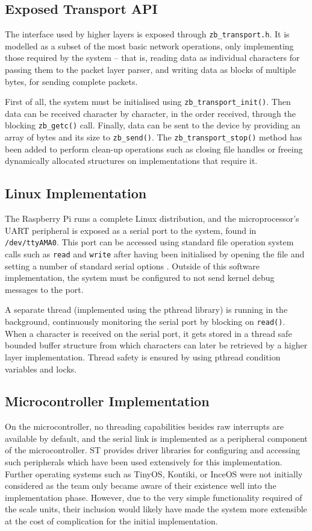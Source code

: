 \subsection{Exposed Transport API}
The interface used by higher layers is exposed through \texttt{zb\_transport.h}. It is modelled as a subset of the most basic network operations, only implementing those required by the system -- that is, reading data as individual characters for passing them to the packet layer parser, and writing data as blocks of multiple bytes, for sending complete packets.

First of all, the system must be initialised using \texttt{zb\_transport\_init()}. Then data can be received character by character, in the order received, through the blocking \texttt{zb\_getc()} call. Finally, data can be sent to the device by providing an array of bytes and its size to \texttt{zb\_send()}. The \texttt{zb\_transport\_stop()} method has been added to perform clean-up operations such as closing file handles or freeing dynamically allocated structures on implementations that require it.

\subsection{Linux Implementation}
The Raspberry Pi runs a complete Linux distribution, and the microprocessor's UART peripheral is exposed as a serial port to the system, found in \texttt{/dev/ttyAMA0}. This port can be accessed using standard file operation system calls such as \texttt{read} and \texttt{write} after having been initialised by opening the file and setting a number of standard serial options \cite{posix-serial-programming}. Outside of this software implementation, the system must be configured to not send kernel debug messages to the port\cite{pi-tty}.

A separate thread (implemented using the pthread library) is running in the background, continuously monitoring the serial port by blocking on \texttt{read()}. When a character is received on the serial port, it gets stored in a thread safe bounded buffer structure from which characters can later be  retrieved by a higher layer implementation. Thread safety is ensured by using pthread condition variables and locks.

\subsection{Microcontroller Implementation}
On the microcontroller, no threading capabilities besides raw interrupts are available by default, and the serial link is implemented as a peripheral component of the microcontroller. ST provides driver libraries for configuring and accessing such peripherals which have been used extensively for this implementation. Further operating systems such as TinyOS, Kontiki, or InceOS were not initially considered as the team only became aware of their existence well into the implementation phase. However, due to the very simple functionality required of the scale units, their inclusion would likely have made the system more extensible at the cost of complication for the initial implementation.

